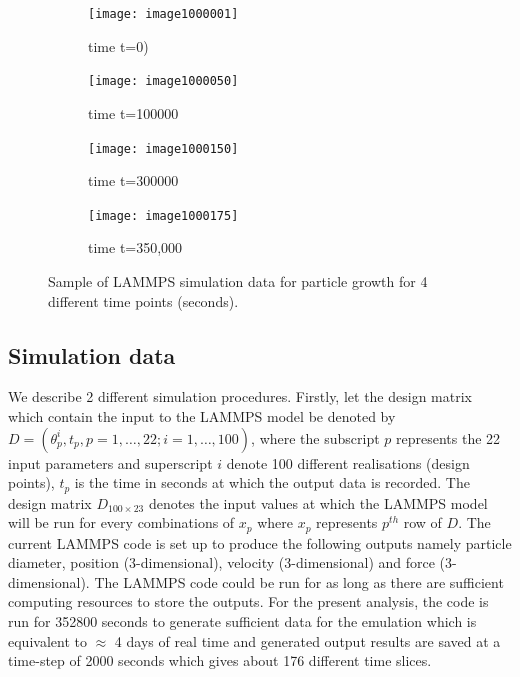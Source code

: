 \documentclass[12pt,titlepage]{report}
\theoremstyle{definition}
\theoremstyle{remark}
\begin{document}
\begin{figure}[!ht]
\begin{subfigure}[b]{.5\textwidth}
\texttt{[image: image1000001]}
\caption{time t=0)}
\label{}
\end{subfigure}%
\begin{subfigure}[b]{.5\textwidth}
\texttt{[image: image1000050]}
\caption{time t=100000}
\label{}
\end{subfigure}\vspace*{-.1em}
\begin{subfigure}[b]{.5\textwidth}
\texttt{[image: image1000150]}
\caption{time t=300000}
\label{}
\end{subfigure}\vspace*{-.1em}
\begin{subfigure}[b]{.5\textwidth}
\texttt{[image: image1000175]}
\caption{time t=350,000}
\end{subfigure}\vspace*{-.1em}
\caption{Sample of LAMMPS simulation data for particle growth for 4 different time points (seconds).}\label{myfig1}
\end{figure}


\subsection{Simulation data}
We describe 2 different simulation procedures. Firstly, let the design matrix which contain the input to the LAMMPS model be denoted by $D=(\theta^i_p, t_p, p=1,\ldots,22; i=1,\ldots,100)$, where the subscript $p$ represents the 22 input parameters and superscript $i$ denote 100 different realisations (design points), $t_p$ is the time in seconds at which the output data is recorded. The design matrix $D_{100 \times 23}$ denotes the input values at which the LAMMPS model will be run for every combinations of $x_p$ where $x_p$ represents $p^{th}$ row of $D$. The current LAMMPS code is set up to produce the following outputs namely particle diameter, position (3-dimensional), velocity (3-dimensional) and force (3-dimensional). The LAMMPS code could be run for as long as there are sufficient computing resources to store the outputs. For the present analysis, the code is run for 352800 seconds to generate sufficient data for the emulation which is equivalent to $\approx$ 4 days of real time and generated output results are saved at a time-step of 2000 seconds which gives about 176 different time slices. 
\end{document}
